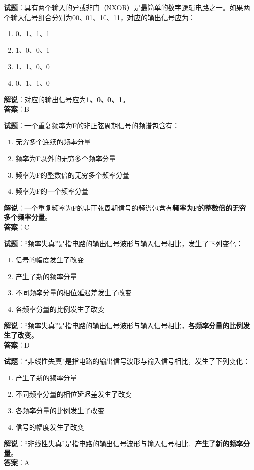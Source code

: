 \documentclass{ctexbook}
\begin{document}
\bigskip


\noindent\textbf{试题：}具有两个输入的异或非门（NXOR）是最简单的数字逻辑电路之一。如果两个输入信号组合分别为00、01、10、11，对应的输出信号应为：
\begin{enumerate}[leftmargin=3em]
\item 0、1、1、1
\item 1、0、0、1
\item 1、1、0、0
\item 0、1、1、0
\end{enumerate}
\noindent\textbf{解说：}对应的输出信号应为\textbf{1、0、0、1}。\\\noindent\textbf{答案：}B




\bigskip


\noindent\textbf{试题：}一个重复频率为F的非正弦周期信号的频谱包含有：
\begin{enumerate}[leftmargin=3em]
\item 无穷多个连续的频率分量
\item 频率为F以外的无穷多个频率分量
\item 频率为F的整数倍的无穷多个频率分量
\item 频率为F的一个频率分量
\end{enumerate}
\noindent\textbf{解说：}一个重复频率为F的非正弦周期信号的频谱包含有\textbf{频率为F的整数倍的无穷多个频率分量}。\\\noindent\textbf{答案：}C




\bigskip


\noindent\textbf{试题：}“频率失真”是指电路的输出信号波形与输入信号相比，发生了下列变化：
\begin{enumerate}[leftmargin=3em]
\item 信号的幅度发生了改变
\item 产生了新的频率分量
\item 不同频率分量的相位延迟差发生了改变
\item 各频率分量的比例发生了改变
\end{enumerate}
\noindent\textbf{解说：}“频率失真”是指电路的输出信号波形与输入信号相比，\textbf{各频率分量的比例发生了改变}。\\\noindent\textbf{答案：}D




\bigskip


\noindent\textbf{试题：}“非线性失真”是指电路的输出信号波形与输入信号相比，发生了下列变化：
\begin{enumerate}[leftmargin=3em]
\item 产生了新的频率分量
\item 不同频率分量的相位延迟差发生了改变
\item 各频率分量的比例发生了改变
\item 信号的幅度发生了改变
\end{enumerate}
\noindent\textbf{解说：}“非线性失真”是指电路的输出信号波形与输入信号相比，\textbf{产生了新的频率分量}。\\\noindent\textbf{答案：}A
\end{document}
